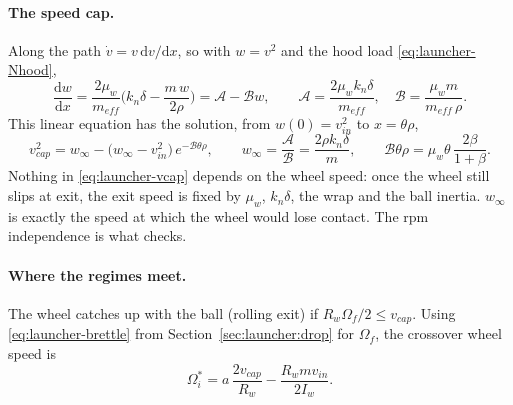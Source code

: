 \paragraph{The speed cap.} Along the path $\dot v = v\,\mathrm{d}v/\mathrm{d}x$, so with $w = v^2$ and the
hood load \eqref{eq:launcher-Nhood},
\begin{equation}
  \frac{\mathrm{d}w}{\mathrm{d}x} = \frac{2\mu_w}{m_{eff}}\Big(k_n\delta - \frac{m\,w}{2\rho}\Big)
  = \mathcal{A} - \mathcal{B}w, \qquad
  \mathcal{A} = \frac{2\mu_w k_n\delta}{m_{eff}},\quad \mathcal{B} = \frac{\mu_w m}{m_{eff}\,\rho}.
  \label{eq:launcher-wode}
\end{equation}
This linear equation has the solution, from $w(0) = v_{in}^2$ to $x = \theta\rho$,
\begin{equation}
  v_{cap}^2 = w_\infty - \big(w_\infty - v_{in}^2\big)\,e^{-\mathcal{B}\theta\rho}, \qquad
  w_\infty = \frac{\mathcal{A}}{\mathcal{B}} = \frac{2\rho k_n\delta}{m}, \qquad
  \mathcal{B}\theta\rho = \mu_w\theta\,\frac{2\beta}{1+\beta}.
  \label{eq:launcher-vcap}
\end{equation}
Nothing in \eqref{eq:launcher-vcap} depends on the wheel speed: once the wheel still slips at exit, the exit
speed is fixed by $\mu_w$, $k_n\delta$, the wrap and the ball inertia. $w_\infty$ is exactly the speed at
which the wheel would lose contact. The rpm independence is what 
checks.

\paragraph{Where the regimes meet.} The wheel catches up with the ball (rolling exit) if
$R_w\Omega_f/2 \le v_{cap}$. Using \eqref{eq:launcher-brettle} from Section~\ref{sec:launcher:drop} for
$\Omega_f$, the crossover wheel speed is
\begin{equation}
  \Omega_i^{*} = a\,\frac{2v_{cap}}{R_w} - \frac{R_w m v_{in}}{2I_w}.
  \label{eq:launcher-crossover}
\end{equation}

